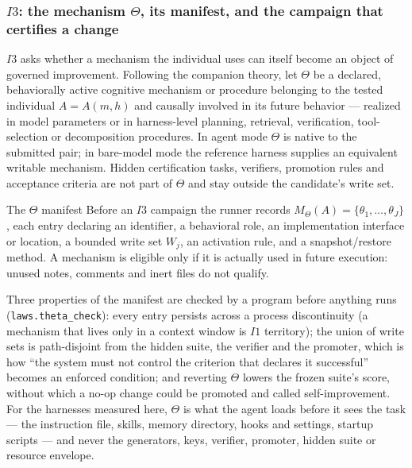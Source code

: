 \documentclass[11pt]{article}
\theoremstyle{definition}
\begin{document}
\subsubsection{$I3$: the mechanism $\Theta$, its manifest, and the campaign that certifies a change}\label{sec:i3}

$I3$ asks whether a mechanism the individual uses can itself become an object of governed improvement. Following the companion theory, let $\Theta$ be a declared, behaviorally active cognitive mechanism or procedure belonging to the tested individual $A=A(m,h)$ and causally involved in its future behavior --- realized in model parameters or in harness-level planning, retrieval, verification, tool-selection or decomposition procedures. In agent mode $\Theta$ is native to the submitted pair; in bare-model mode the reference harness supplies an equivalent writable mechanism. Hidden certification tasks, verifiers, promotion rules and acceptance criteria are not part of $\Theta$ and stay outside the candidate's write set.

\begin{claimbox}{The $\Theta$ manifest}
Before an $I3$ campaign the runner records $M_\Theta(A) = \{\theta_1, \ldots, \theta_J\}$, each entry declaring an identifier, a behavioral role, an implementation interface or location, a bounded write set $W_j$, an activation rule, and a snapshot/restore method. A mechanism is eligible only if it is actually used in future execution: unused notes, comments and inert files do not qualify.
\end{claimbox}

Three properties of the manifest are checked by a program before anything runs (\texttt{laws.theta\_check}): every entry persists across a process discontinuity (a mechanism that lives only in a context window is $I1$ territory); the union of write sets is path-disjoint from the hidden suite, the verifier and the promoter, which is how ``the system must not control the criterion that declares it successful'' becomes an enforced condition; and reverting $\Theta$ lowers the frozen suite's score, without which a no-op change could be promoted and called self-improvement. For the harnesses measured here, $\Theta$ is what the agent loads before it sees the task --- the instruction file, skills, memory directory, hooks and settings, startup scripts --- and never the generators, keys, verifier, promoter, hidden suite or resource envelope.
\end{document}
